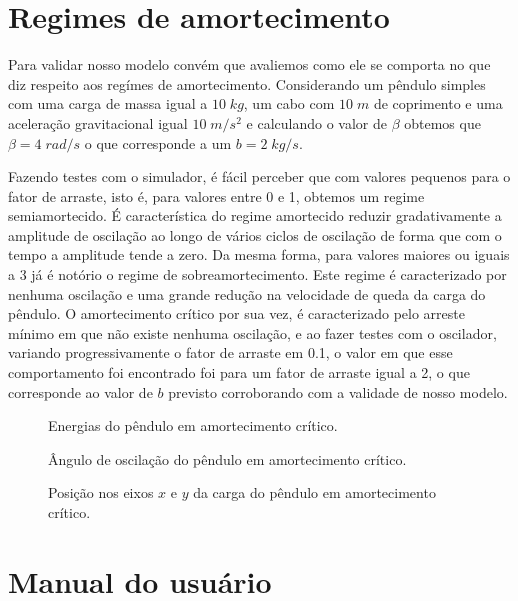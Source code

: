 \documentclass[12pt]{article}
\begin{document}
    \section*{Regimes de amortecimento}
    Para validar nosso modelo convém que avaliemos como ele se comporta no que diz respeito aos regímes de amortecimento.
    Considerando um pêndulo simples com uma carga de massa igual a $10\;kg$, um cabo com $10\;m$ de coprimento e uma aceleração
    gravitacional igual $10\;m/s^2$ e calculando o valor de $\beta$ obtemos que $\beta=4\;rad/s$ o que corresponde a um
    $b=2\;kg/s$.
    \par Fazendo testes com o simulador, é fácil perceber que com valores pequenos para o fator de arraste, isto é, para valores entre
    0 e 1, obtemos um regime semiamortecido. É característica do regime amortecido reduzir gradativamente a amplitude de oscilação
    ao longo de vários ciclos de oscilação de forma que com o tempo a amplitude tende a zero. Da mesma forma, para valores maiores
    ou iguais a 3 já é notório o regime de sobreamortecimento. Este regime é caracterizado por nenhuma oscilação e uma grande redução
    na velocidade de queda da carga do pêndulo. O amortecimento crítico por sua vez, é caracterizado pelo arreste mínimo em
    que não existe nenhuma oscilação, e ao fazer testes com o oscilador, variando progressivamente o fator de arraste em 0.1,
    o valor em que esse comportamento foi encontrado foi para um fator de arraste igual a 2, o que corresponde ao valor de $b$ previsto
    corroborando com a validade de nosso modelo.
    \begin{figure}[H]
        \centering
        \makebox[\textwidth]{\scalebox{0.4}{}}
        \caption{Energias do pêndulo em amortecimento crítico.}
    \end{figure}
    \begin{figure}[H]
        \centering
        \makebox[\textwidth]{\scalebox{0.4}{}}
        \caption{Ângulo de oscilação do pêndulo em amortecimento crítico.}
    \end{figure}
    \begin{figure}[H]
        \centering
        \makebox[\textwidth]{\scalebox{0.4}{}}
        \caption{Posição nos eixos $x$ e $y$ da carga do pêndulo em amortecimento crítico.}
    \end{figure}
    \newpage
    \section*{Manual do usuário}
\end{document}
